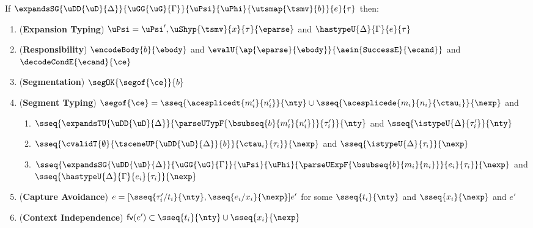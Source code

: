 \begin{theorem}
\label{thm:tsc-SES}
If $\expandsSG{\uDD{\uD}{\Delta}}{\uGG{\uG}{\Gamma}}{\uPsi}{\uPhi}{\utsmap{\tsmv}{b}}{e}{\tau}$ then:
\begin{enumerate}
\item (\textbf{Expansion Typing}) $\uPsi = \uPsi', \uShyp{\tsmv}{x}{\tau}{\eparse}$ and $\hastypeU{\Delta}{\Gamma}{e}{\tau}$
\item (\textbf{Responsibility}) $\encodeBody{b}{\ebody}$ and $\evalU{\ap{\eparse}{\ebody}}{\aein{\mathtt{SuccessE}}{\ecand}}$ and $\decodeCondE{\ecand}{\ce}$
\item (\textbf{Segmentation}) $\segOK{\segof{\ce}}{b}$
\item (\textbf{Segment Typing}) $\segof{\ce} = \sseq{\acesplicedt{m'_i}{n'_i}}{\nty} \cup \sseq{\acesplicede{m_i}{n_i}{\ctau_i}}{\nexp}$ and 
\begin{enumerate}
\item $\sseq{
      \expandsTU{\uDD{\uD}{\Delta}}
      {
        \parseUTypF{\bsubseq{b}{m'_i}{n'_i}}
      }{\tau'_i}
    }{\nty}$ and $\sseq{\istypeU{\Delta}{\tau'_i}}{\nty}$
\item $\sseq{
  \cvalidT{\emptyset}{
    \tsceneUP
      {\uDD
        {\uD}{\Delta}
      }{b}
  }{
    \ctau_i
  }{\tau_i}
}{\nexp}$ and $\sseq{\istypeU{\Delta}{\tau_i}}{\nexp}$
\item $\sseq{
  \expandsSG
    {\uDD{\uD}{\Delta}}
    {\uGG{\uG}{\Gamma}}
    {\uPsi}
    {\uPhi}
    {\parseUExpF{\bsubseq{b}{m_i}{n_i}}}
    {e_i}
    {\tau_i}
}{\nexp}$ and $\sseq{\hastypeU{\Delta}{\Gamma}{e_i}{\tau_i}}{\nexp}$
\end{enumerate}
\item (\textbf{Capture Avoidance}) $e = [\sseq{\tau'_i/t_i}{\nty}, \sseq{e_i/x_i}{\nexp}]e'$ for some $\sseq{t_i}{\nty}$ and $\sseq{x_i}{\nexp}$ and $e'$
\item (\textbf{Context Independence}) $\mathsf{fv}(e') \subset \sseq{t_i}{\nty} \cup \sseq{x_i}{\nexp}$
\end{enumerate}
\end{theorem}
